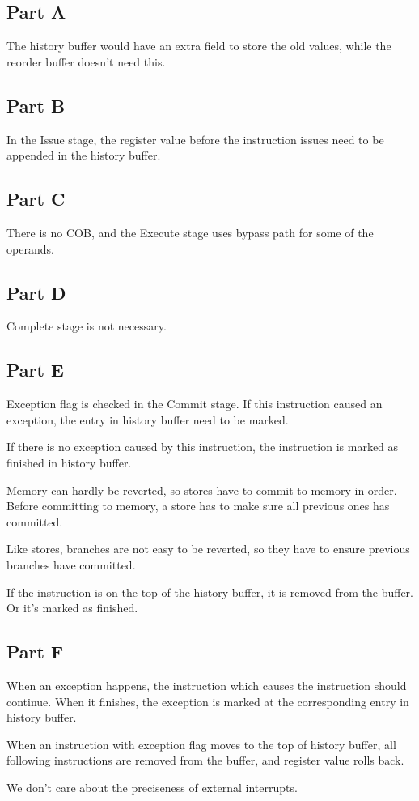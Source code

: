 \documentclass[11pt,leqno]{article}
\begin{document}
\subsection*{Part A}
The history buffer would have an extra field to store the old values, while the reorder buffer doesn't need this.

\subsection*{Part B}
In the Issue stage, the register value before the instruction issues need to be appended in the history buffer. 

\subsection*{Part C}
There is no COB, and the Execute stage uses bypass path for some of the operands.

\subsection*{Part D}
Complete stage is not necessary. 

\subsection*{Part E}
Exception flag is checked in the Commit stage. If this instruction caused an exception, the entry in history buffer need to be marked.

If there is no exception caused by this instruction, the instruction is marked as finished in history buffer.

Memory can hardly be reverted, so stores have to commit to memory in order. Before committing to memory, a store has to make sure all previous ones has committed. 

Like stores, branches are not easy to be reverted, so they have to ensure previous branches have committed. 

If the instruction is on the top of the history buffer, it is removed from the buffer. Or it's marked as finished.

\subsection*{Part F}
When an exception happens, the instruction which causes the instruction should continue. When it finishes, the exception is marked at the corresponding entry in history buffer.  

When an instruction with exception flag moves to the top of history buffer, all following instructions are removed from the buffer, and register value rolls back.

We don't care about the preciseness of external interrupts.
\end{document}
